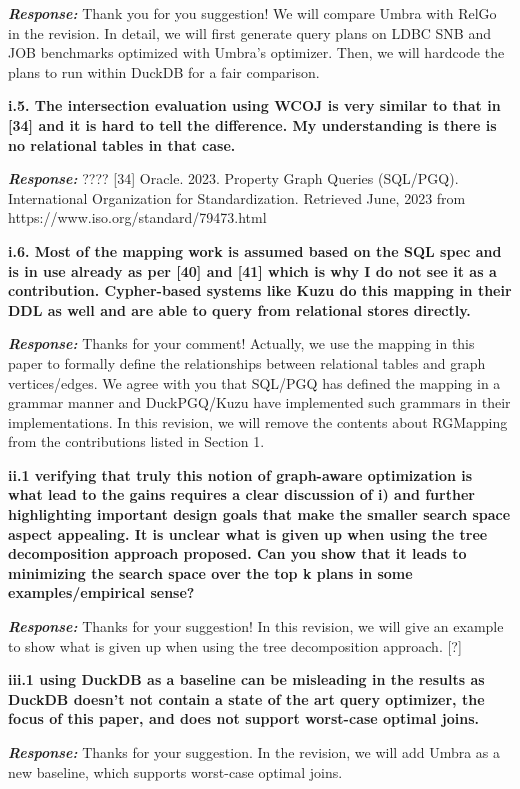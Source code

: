 \textbf{\textit{Response: }}
Thank you for you suggestion! We will compare Umbra with RelGo in the revision. In detail, we will first generate query plans on LDBC SNB and JOB benchmarks optimized with Umbra's optimizer. Then, we will hardcode the plans to run within DuckDB for a fair comparison.


\textbf{
i.5. The intersection evaluation using WCOJ is very similar to that in [34] and it is hard to tell the difference. My understanding is there is no relational tables in that case.}

\textbf{\textit{Response: }}
????
[34] Oracle. 2023. Property Graph Queries (SQL/PGQ). International Organization for Standardization. Retrieved June, 2023 from https://www.iso.org/standard/79473.html

\textbf{
i.6. Most of the mapping work is assumed based on the SQL spec and is in use already as per [40] and [41] which is why I do not see it as a contribution. Cypher-based systems like Kuzu do this mapping in their DDL as well and are able to query from relational stores directly.}

\textbf{\textit{Response: }}
Thanks for your comment! Actually, we use the mapping in this paper to formally define the relationships between relational tables and graph vertices/edges. We agree with you that SQL/PGQ has defined the mapping in a grammar manner and DuckPGQ/Kuzu have implemented such grammars in their implementations. In this revision, we will remove the contents about RGMapping from the contributions listed in Section 1.

\textbf{
ii.1 verifying that truly this notion of graph-aware optimization is what lead to the gains requires a clear discussion of i) and further highlighting important design goals that make the smaller search space aspect appealing.
It is unclear what is given up when using the tree decomposition approach proposed. Can you show that it leads to minimizing the search space over the top k plans in some examples/empirical sense?}

\textbf{\textit{Response: }}
Thanks for your suggestion! In this revision, we will give an example to show what is given up when using the tree decomposition approach. [?]


\textbf{
iii.1 using DuckDB as a baseline can be misleading in the results
as DuckDB doesn't not contain a state of the art query optimizer, the focus of this paper, and does not support worst-case optimal joins.}

\textbf{\textit{Response: }}
Thanks for your suggestion. In the revision, we will add Umbra as a new baseline, which supports worst-case optimal joins.

